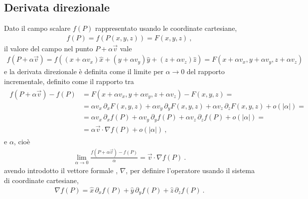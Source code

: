 \documentclass[letterpaper,10pt,italian]{jupyterBook}
\begin{document}
\subsection{Derivata direzionale}
\label{\detokenize{ch/vector-calculus/derivatives:derivata-direzionale}}\label{\detokenize{ch/vector-calculus/derivatives:vector-calculus-derivatives-directional}}
\sphinxAtStartPar
Dato il campo scalare \(f(P)\) rappresentato usando le coordinate cartesiane,
\begin{equation*}
\begin{split}
f(P) = f\left(P(x,y,z)\right) = F(x,y,z) \ ,
\end{split}
\end{equation*}
\sphinxAtStartPar
il valore del campo nel punto \(P + \alpha \vec{v}\) vale
\begin{equation*}
\begin{split}
f(P + \alpha \vec{v}) 
= f\left( (x+\alpha v_x)\hat{x} + (y+\alpha v_y) \hat{y} + (z + \alpha v_z)\hat{z} \right) 
= F(x+\alpha v_x, y+\alpha v_y, z + \alpha v_z)
\end{split}
\end{equation*}
\sphinxAtStartPar
e la derivata direzionale è definita come il limite per \(\alpha \rightarrow 0\) del rapporto incrementale, definito come il rapporto tra
\begin{equation*}
\begin{split}\begin{aligned}
  f(P + \alpha \vec{v}) - f(P)
  & = F(x+\alpha v_x, y+\alpha v_y, z + \alpha v_z) - F(x, y, z) = \\
  & = \alpha v_x \, \partial_x F(x,y,z) +  \alpha v_y \, \partial_y F(x,y,z) + \alpha v_z \, \partial_z F(x,y,z) + o(|\alpha|) = \\
  & = \alpha v_x \, \partial_x f(P) +  \alpha v_y \, \partial_y f(P) + \alpha v_z \, \partial_z f(P) + o(|\alpha|) = \\
  & = \alpha \vec{v} \cdot \nabla f(P) + o(|\alpha|) \ ,
\end{aligned}\end{split}
\end{equation*}
\sphinxAtStartPar
e \(\alpha\), cioè
\begin{equation*}
\begin{split}\lim_{\alpha \rightarrow 0} \frac{f(P + \alpha \vec{v}) - f(P)}{\alpha} = \vec{v} \cdot \nabla f(P) \ .\end{split}
\end{equation*}
\sphinxAtStartPar
avendo introdotto il vettore formale , \(\nabla \), per definire l’operatore  usando il sistema di coordinate cartesiane,
\begin{equation*}
\begin{split}\nabla f(P) = \hat{x} \, \partial_x f(P) + \hat{y} \, \partial_y f(P) + \hat{z} \, \partial_z f(P) \ . \end{split}
\end{equation*}
\end{document}
